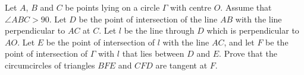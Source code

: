Let $A$, $B$ and $C$ be points lying on a circle $\Gamma$ with centre $O$. Assume that $\angle ABC > 90$. Let $D$ be the point of intersection of the line $AB$ with the line perpendicular to $AC$ at $C$. Let $l$ be the line through $D$ which is perpendicular to $AO$. Let $E$ be the point of intersection of $l$ with the line $AC$, and let $F$ be the point of intersection of $\Gamma$ with $l$ that lies between $D$ and $E$.
Prove that the circumcircles of triangles $BFE$ and $CFD$ are tangent at $F$.